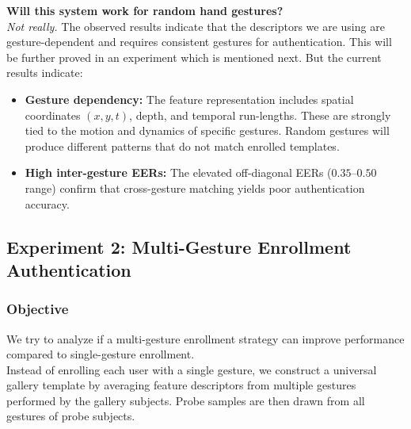 \noindent
\textbf{Will this system work for random hand gestures?} \\
\textit{Not really.} The observed results indicate that the descriptors we are using are gesture-dependent and requires consistent gestures for authentication. This will be further proved in an experiment which is mentioned next. But the current results indicate:


\begin{itemize}
    \item \textbf{Gesture dependency:} The feature representation includes spatial coordinates $(x, y, t)$, depth, and temporal run-lengths. These are strongly tied to the motion and dynamics of specific gestures. Random gestures will produce different patterns that do not match enrolled templates.
    \item \textbf{High inter-gesture EERs:} The elevated off-diagonal EERs ($0.35$–$0.50$ range) confirm that cross-gesture matching yields poor authentication accuracy.
\end{itemize}

\subsection{Experiment 2: Multi-Gesture Enrollment Authentication}

\subsubsection*{Objective}
We try to analyze if a multi-gesture enrollment strategy can
improve performance compared to single-gesture enrollment. \\
Instead of enrolling each user with a single gesture, we construct a universal
gallery template by averaging feature descriptors from multiple gestures performed by
the gallery subjects. Probe samples are then drawn from all gestures of probe subjects.

